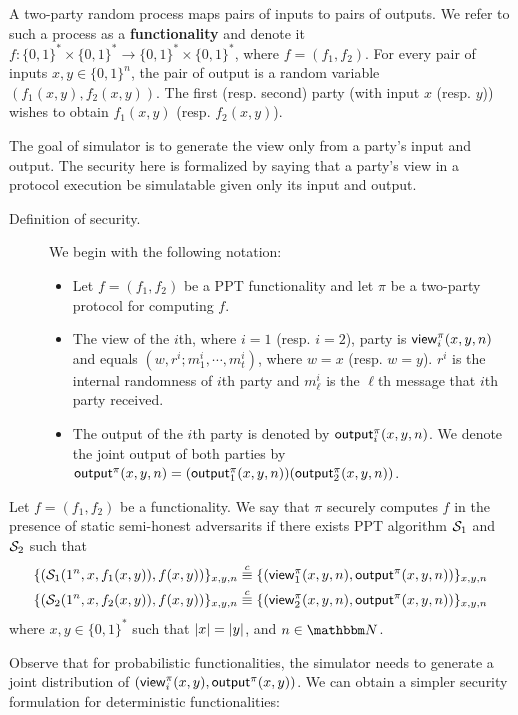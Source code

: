 \begin{definition} A two-party random process maps pairs of inputs to pairs of outputs. We refer to such a process as a {\bf functionality} and denote it $f:\{0,1\}^*\times\{0,1\}^*\to\{0,1\}^*\times\{0,1\}^*$, where $f=(f_1,f_2)$. For every pair of inputs $x,y\in\{0,1\}^n$, the pair of output is a random variable $(f_1(x,y),f_2(x,y))$. The first (resp. second) party (with input $x$ (resp. $y$)) wishes to obtain $f_1(x,y)$ (resp. $f_2(x,y)$).
\end{definition}
The goal of simulator is to generate the view only from a party's input and output. The security here is formalized by saying that a party's view in a protocol execution be simulatable given only its input and output. 
\begin{description}
\item[Definition of security.] We begin with the following notation:
\begin{itemize}
    \item Let $f=(f_1,f_2)$ be a PPT functionality and let $\pi$ be a two-party protocol for computing $f$.
    \item The view of the $i$th, where $i=1$ (resp. $i=2$), party is ${\sf view}^\pi_i(x,y,n)$ and equals $(w,r^i;m^i_1,\cdots,m^i_t)$, where $w=x$ (resp. $w=y$). $r^i$ is the internal randomness of $i$th party and $m^i_\ell$ is the $\ell$th message that $i$th party received.
    \item The output of the $i$th party is denoted by ${\sf output}^\pi_i(x,y,n)$. We denote the joint output of both parties by ${\sf output}^\pi(x,y,n)=({\sf output}^\pi_1(x,y,n))({\sf output}^\pi_2(x,y,n))$.
\end{itemize}
\end{description}
\begin{definition}Let $f=(f_1,f_2)$ be a functionality. We say that {\sf$\pi$ securely computes $f$ in the presence of static semi-honest adversarits} if there exists PPT algorithm $\mathcal{S}_1$ and $\mathcal{S}_2$ such that
\begin{align*}
    \{(\mathcal{S}_1(1^n,x,f_1(x,y)), f(x,y))\}_{x,y,n} \stackrel{c}{\equiv} \{({\sf view}^\pi_1(x,y,n),{\sf output}^\pi(x,y,n))\}_{x,y,n} \\
    \{(\mathcal{S}_2(1^n,x,f_2(x,y)), f(x,y))\}_{x,y,n} \stackrel{c}{\equiv} \{({\sf view}^\pi_2(x,y,n),{\sf output}^\pi(x,y,n))\}_{x,y,n}
\end{align*}
where $x,y\in\{0,1\}^*$ such that $\left|x\right| = \left|y\right|$, and $n\in\N$.
\end{definition}
Observe that for probabilistic functionalities, the simulator needs to generate a joint distribution of $({\sf view}_i^\pi(x,y), {\sf output}^\pi(x,y))$. We can obtain a simpler security formulation for deterministic functionalities:
